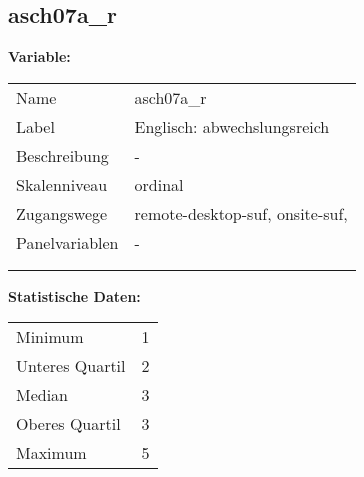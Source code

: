 	
	
	\subsection{asch07a\_r}
	\label{subSection:asch07a_r}

	\noindent\textbf{Variable:}\\
		\begin{tabular}{lL{11.3cm}}
			\label{tableVariable:asch07a_r}
			Name & asch07a\_r \\
			Label & Englisch: abwechslungsreich \\
			Beschreibung & - \\
			Skalenniveau & ordinal \\
			Zugangswege &
				remote-desktop-suf,
				onsite-suf,
 \\
			Panelvariablen & -
			 \\
			 \\
 \\
		\end{tabular}



		\vspace*{1 cm}
		\noindent\textbf{Statistische Daten:}\\
			\begin{tabular}{ll}
				\label{tableStatistics:asch07a_r}
					Minimum & 1 \\
					Unteres Quartil & 2 \\
					Median & 3 \\
					Oberes Quartil & 3 \\
					Maximum & 5 \\
			\end{tabular}



